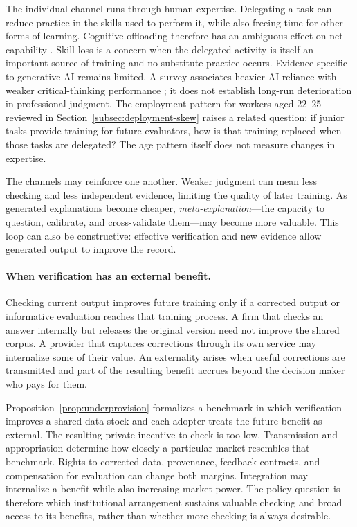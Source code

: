 \documentclass[12pt]{article}
\theoremstyle{plain}
\theoremstyle{definition}
\theoremstyle{remark}
\begin{document}
The individual channel runs through human expertise. Delegating a task can reduce practice
in the skills used to perform it, while also freeing time for other
forms of learning. Cognitive offloading therefore has an ambiguous
effect on net capability \citep{RiskoGilbert2016}. Skill loss is a
concern when the delegated activity is itself an important source of
training and no substitute practice occurs. Evidence specific to
generative AI remains limited. A survey associates heavier AI reliance
with weaker critical-thinking performance \citep{Gerlich2025}; it does
not establish long-run deterioration in professional judgment.
The employment pattern for workers aged 22--25 reviewed in
Section~\ref{subsec:deployment-skew} raises a related question: if junior
tasks provide training for future evaluators, how is that training
replaced when those tasks are delegated? The age pattern itself does not
measure changes in expertise.

The channels may reinforce one another. Weaker judgment can mean
less checking and less independent evidence, limiting the quality of
later training. As generated explanations become cheaper,
\emph{meta-explanation}---the capacity to question, calibrate, and
cross-validate them---may become more valuable. This loop can also be
constructive: effective verification and new evidence allow generated
output to improve the record.

\paragraph{When verification has an external benefit.}
Checking current output improves future training only if a corrected
output or informative evaluation reaches that training process. A firm
that checks an answer internally but releases the original version need
not improve the shared corpus. A provider that captures corrections
through its own service may internalize some of their value. An
externality arises when useful corrections are transmitted and part of
the resulting benefit accrues beyond the decision maker who pays for
them.

Proposition~\ref{prop:underprovision} formalizes a benchmark in which
verification improves a shared data stock and each adopter treats the
future benefit as external. The resulting private incentive to check is
too low. Transmission and appropriation determine how closely a
particular market resembles that benchmark. Rights to corrected data,
provenance, feedback contracts, and compensation for evaluation can
change both margins. Integration may internalize a benefit while also
increasing market power. The policy question is therefore which
institutional arrangement sustains valuable checking and broad access
to its benefits, rather than whether more checking is always desirable.
\end{document}
